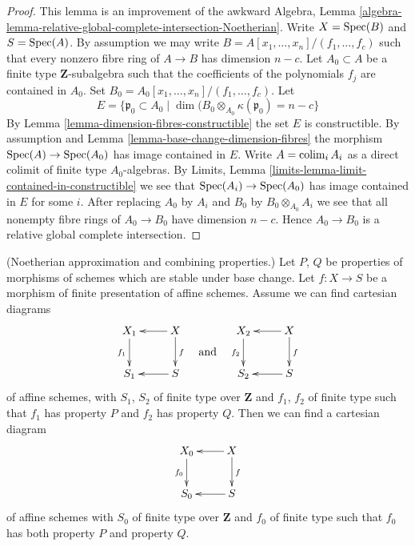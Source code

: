 \begin{proof}
This lemma is an improvement of the awkward
Algebra,
Lemma \ref{algebra-lemma-relative-global-complete-intersection-Noetherian}.
Write $X = \mathop{\rm Spec}(B)$ and $S = \mathop{\rm Spec}(A)$.
By assumption we may write $B = A[x_1, \ldots, x_n]/(f_1, \ldots, f_c)$
such that every nonzero fibre ring of $A \to B$ has dimension $n - c$.
Let $A_0 \subset A$ be a finite type $\mathbf{Z}$-subalgebra
such that the coefficients of the polynomials $f_j$ are contained in
$A_0$. Set $B_0 = A_0[x_1, \ldots, x_n]/(f_1, \ldots, f_c)$.
Let
$$
E = \{\mathfrak p_0 \subset A_0 \mid
\dim(B_0 \otimes_{A_0} \kappa(\mathfrak p_0) = n - c \}
$$
By
Lemma \ref{lemma-dimension-fibres-constructible}
the set $E$ is constructible. By assumption and
Lemma \ref{lemma-base-change-dimension-fibres}
the morphism $\mathop{\rm Spec}(A) \to \mathop{\rm Spec}(A_0)$ has image contained in $E$.
Write $A = \mathop{\rm colim}\nolimits_i A_i$ as a
direct colimit of finite type $A_0$-algebras. By
Limits, Lemma \ref{limits-lemma-limit-contained-in-constructible}
we see that $\mathop{\rm Spec}(A_i) \to \mathop{\rm Spec}(A_0)$ has image contained in $E$
for some $i$. After replacing $A_0$ by $A_i$ and
$B_0$ by $B_0 \otimes_{A_0} A_i$ we see that
all nonempty fibre rings of $A_0 \to B_0$ have dimension $n - c$.
Hence $A_0 \to B_0$ is a relative global complete intersection.
\end{proof}

\begin{lemma}
\label{lemma-Noetherian-approximation-combine}
(Noetherian approximation and combining properties.)
Let $P$, $Q$ be properties of morphisms of schemes which are stable
under base change. Let $f : X \to S$ be a morphism of finite presentation
of affine schemes. Assume we can find cartesian diagrams
$$
\vcenter{
\xymatrix{
X_1 \ar[d]_{f_1} & X \ar[l] \ar[d]^f \\
S_1 & S \ar[l]
}
}
\quad\text{and}\quad
\vcenter{
\xymatrix{
X_2 \ar[d]_{f_2} & X \ar[l] \ar[d]^f \\
S_2 & S \ar[l]
}
}
$$
of affine schemes, with $S_1$, $S_2$ of finite type over $\mathbf{Z}$
and $f_1$, $f_2$ of finite type such that $f_1$ has property $P$
and $f_2$ has property $Q$. Then we can find a cartesian diagram
$$
\xymatrix{
X_0 \ar[d]_{f_0} & X \ar[l] \ar[d]^f \\
S_0 & S \ar[l]
}
$$
of affine schemes with $S_0$ of finite type over $\mathbf{Z}$
and $f_0$ of finite type such that $f_0$ has both property $P$ and
property $Q$.
\end{lemma}


